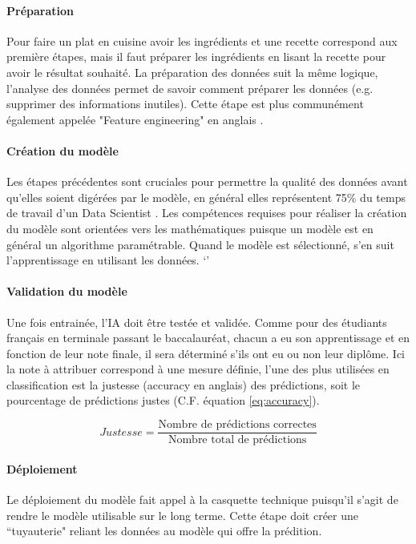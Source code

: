 \documentclass[10pt, french, a4paper]{report}
\begin{document}
\paragraph{Préparation}
Pour faire un plat en cuisine avoir les ingrédients et une recette correspond aux première étapes, mais il faut préparer les ingrédients en lisant la recette pour avoir le résultat souhaité. La préparation des données suit la même logique, l'analyse des données permet de savoir comment préparer les données (e.g. supprimer des informations inutiles). Cette étape est plus communément également appelée "Feature engineering" en anglais \citep{mayo_machine_2018}.

\paragraph{Création du modèle}
Les étapes précédentes sont cruciales pour permettre la qualité des données avant qu'elles soient digérées par le modèle, en général elles représentent 75\% du temps de travail d'un Data Scientist \citep{figure_eight_state_2019}. Les compétences requises pour réaliser la création du modèle sont orientées vers les mathématiques puisque un modèle est en général un algorithme paramétrable. Quand le modèle est sélectionné, s'en suit l'apprentissage en utilisant les données.
`'
\paragraph{Validation du modèle}
Une fois entrainée, l'IA doit être testée et validée. Comme pour des étudiants français en terminale passant le baccalauréat, chacun a eu son apprentissage et en fonction de leur note finale, il sera déterminé s'ils ont eu ou non leur diplôme. Ici la note à attribuer correspond à une mesure définie, l'une des plus utilisées en classification est la justesse (accuracy en anglais) des prédictions, soit le pourcentage de prédictions justes (C.F. équation \ref{eq:accuracy}).

\begin{equation}\label{eq:accuracy}
    Justesse = \frac{\text{Nombre de prédictions correctes}}{\text{Nombre total de prédictions}}
\end{equation}

\paragraph{Déploiement}
Le déploiement du modèle fait appel à la casquette technique puisqu'il s'agit de rendre le modèle utilisable sur le long terme. Cette étape doit créer une ``tuyauterie" reliant les données au modèle qui offre la prédition. 
\end{document}
